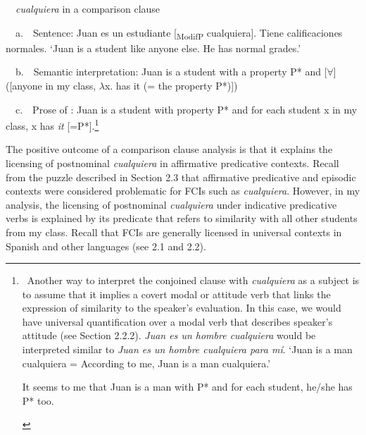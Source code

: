 \begin{styleStandard}
\label{bkm:Ref54682554}\ \ \textit{cualquiera }in a comparison clause
\end{styleStandard}

\begin{styleStandard}
\ \ a.\ \ Sentence: Juan es un estudiante [\textsubscript{ModifP} cualquiera]. Tiene calificaciones normales. ‘Juan is a student like anyone else. He has normal grades.’
\end{styleStandard}

\begin{styleStandard}
\ \ b.\ \ Semantic interpretation: Juan is a student with a property P* and [${\forall}$]([anyone in my class, $\lambda $x. has it (= the property P*)])
\end{styleStandard}

\begin{styleStandard}
\ \ c.\ \ Prose of : Juan is a student with property P* and for each student x in my class, x has \textit{it} [=P*].\footnote{\textrm{\ Another way to interpret the conjoined clause with }\textrm{\textit{cualquiera}}\textrm{ as a subject is to assume that it implies a covert modal or attitude verb that links the expression of similarity to the speaker’s evaluation. In this case, we would have universal quantification over a modal verb that describes speaker’s attitude (see Section 2.2.2). }\textrm{\textit{Juan es un hombre cualquiera}}\textrm{ would be interpreted similar to }\textrm{\textit{Juan es un hombre cualquiera para mí}}\textrm{. ‘Juan is a man cualquiera = According to me, Juan is a man cualquiera.’}\par 
\setcounter{listWWNumxxiiileveli}{0}
\begin{listWWNumxxiiileveli}
\item 
\begin{styleFootnote}
\textrm{It seems to me that Juan is a man with P* and for each student, he/she has P* too.}
\end{styleFootnote}
\end{listWWNumxxiiileveli}
}
\end{styleStandard}

\begin{styleStandard}
The positive outcome of a comparison clause analysis is that it explains the licensing of postnominal \textit{cualquiera} in affirmative predicative contexts. Recall from the puzzle described in Section 2.3 that affirmative predicative and episodic contexts were considered problematic for FCIs such as \textit{cualquiera}. However, in my analysis, the licensing of postnominal \textit{cualquiera} under indicative predicative verbs is explained by its predicate that refers to similarity with all other students from my class. Recall that FCIs are generally licensed in universal contexts in Spanish and other languages (see 2.1 and 2.2).
\end{styleStandard}

